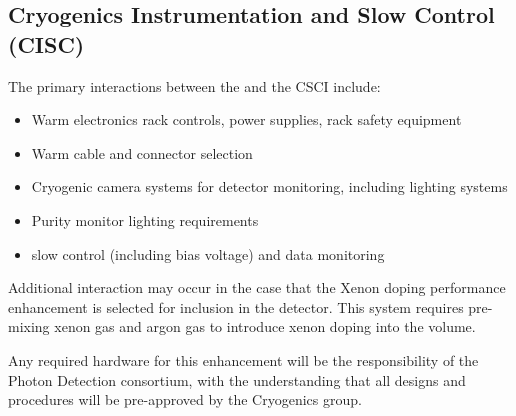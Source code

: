 
\subsection{Cryogenics Instrumentation and Slow Control (CISC)}
\label{sec:fdsp-pd-intfc-xeon}

The primary interactions between the  and the CSCI include:

\begin{itemize}
    \item Warm electronics rack controls, power supplies, rack safety equipment
    \item Warm cable and connector selection
    \item Cryogenic camera systems for detector monitoring, including lighting systems
    \item Purity monitor lighting requirements
    \item {} slow control (including bias voltage) and data monitoring
\end{itemize}

Additional interaction may occur in the case that the Xenon doping performance enhancement is selected for inclusion in the detector.  This system requires pre-mixing xenon gas and argon gas to introduce xenon doping into the \lar volume. 


Any required hardware for this enhancement will be the responsibility of the Photon Detection consortium, with the understanding that all designs and procedures will be pre-approved by the Cryogenics group. 

